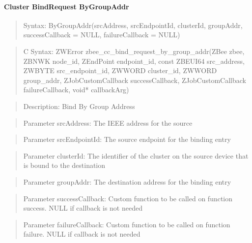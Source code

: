 \paragraph{Cluster BindRequest ByGroupAddr}
\begin{quote}Syntax: ByGroupAddr(srcAddress, srcEndpointId, clusterId, groupAddr, successCallback = NULL, failureCallback = NULL)\end{quote}
\begin{quote}C Syntax: ZWError zbee\_cc\_bind\_request\_by\_group\_addr(ZBee zbee, ZBNWK node\_id, ZEndPoint endpoint\_id, const ZBEUI64 src\_address, ZWBYTE src\_endpoint\_id, ZWWORD cluster\_id, ZWWORD group\_addr, ZJobCustomCallback successCallback, ZJobCustomCallback failureCallback, void* callbackArg)\end{quote}
\begin{quote}Description: Bind By Group Address\end{quote}
\begin{quote}Parameter srcAddress: The IEEE address for the source\end{quote}
\begin{quote}Parameter srcEndpointId: The source endpoint for the binding entry\end{quote}
\begin{quote}Parameter clusterId: The identifier of the cluster on the source device that is bound to the destination\end{quote}
\begin{quote}Parameter groupAddr: The destination address for the binding entry\end{quote}
\begin{quote}Parameter successCallback: Custom function to be called on function success. NULL if callback is not needed\end{quote}
\begin{quote}Parameter failureCallback: Custom function to be called on function failure. NULL if callback is not needed\end{quote}


